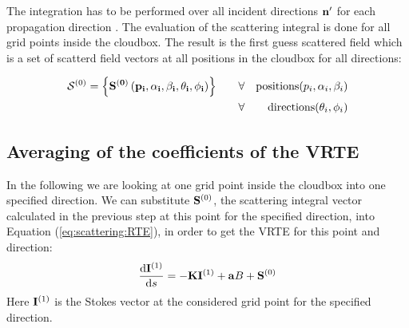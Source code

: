 The integration has to be performed over all incident directions
${\bf n}^\prime$ for each propagation direction \PDir{}. The evaluation
of the scattering integral is done for all grid points inside the
cloudbox. The result is the first guess scattered field 
which is a set of scatterd field vectors at all positions in the
cloudbox for all directions:

\begin{eqnarray}
{\mathcal S}^{(0)} = \left\{ \bf{S}^{(0)} \left( p_i, \alpha_i, \beta_i, \theta_i, \phi_i\right)\right\}  \qquad  
&\forall& {\rm positions } (p_i,\alpha_i, \beta_i)\\
&\forall& {\rm directions } (\theta_i,\phi_i)
\end{eqnarray}


\subsection{Averaging of the coefficients of the VRTE}
\label{scattering:av_coeff}

In the following we are looking at one grid point inside the cloudbox
into one specified direction.  We can substitute ${\bf S}^{(0)}$, the
scattering integral vector calculated in the previous step at this
point for the specified direction, into Equation
(\ref{eq:scattering:RTE}), in order to get the VRTE for this point and
direction:
\begin{eqnarray}
     \frac{\mathrm{d} {\bf I}^{(1)}}{\mathrm{d} s} =
     -{\bf K} {\bf I}^{(1)} + {\bf a} B
     +{\bf S}^{(0)}
\label{eq:scattering:vrte_fs}
\end{eqnarray} 
Here ${\bf I}^{(1)}$ is the Stokes vector at the considered grid point
for the specified direction.


